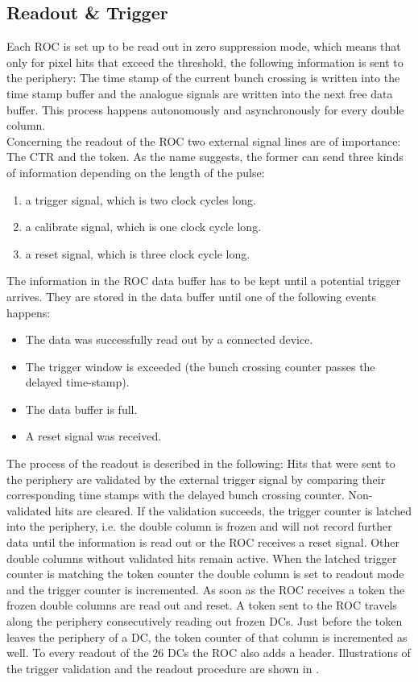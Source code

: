 \subsection{Readout \& Trigger}\label{sread}
Each \ac{ROC} is set up to be read out in zero suppression mode, which means that only for pixel hits that exceed the threshold, the following information is sent to the periphery: The time stamp of the current bunch crossing is written into the time stamp buffer and the analogue signals are written into the next free data buffer. This process happens autonomously and asynchronously for every double column.\\
Concerning the readout of the \ac{ROC} two external signal lines are of importance: The \ac{CTR} and the token. As the name suggests, the former can send three kinds of information depending on the length of the pulse:
\begin{enumerate}
	\item a trigger signal, which is two clock cycles long.
	\item a calibrate signal, which is one clock cycle long.
	\item a reset signal, which is three clock cycle long.
\end{enumerate}
The information in the \ac{ROC} data buffer has to be kept until a potential trigger arrives. They are stored in the data buffer until one of the following events happens: 
\begin{itemize}
	\item The data was successfully read out by a connected device.
	\item The trigger window is exceeded (the bunch crossing counter passes the delayed time-stamp).
	\item The data buffer is full.
	\item A reset signal was received.
\end{itemize}
The process of the readout is described in the following: Hits that were sent to the periphery are validated by the external trigger signal by comparing their corresponding time stamps with the delayed bunch crossing counter. Non-validated hits are cleared. If the validation succeeds, the trigger counter is latched into the periphery, i.e. the double column is frozen and will not record further data until the information is read out or the \ac{ROC} receives a reset signal. Other double columns without validated hits remain active. When the latched trigger counter is matching the token counter the double column is set to readout mode and the trigger counter is incremented. As soon as the \ac{ROC} receives a token the frozen double columns are read out and reset. A token sent to the \ac{ROC} travels along the periphery consecutively reading out frozen \ac{DC}s. Just before the token leaves the periphery of a \ac{DC}, the token counter of that column is incremented as well. To every readout of the $26$ \ac{DC}s the \ac{ROC} also adds a header. Illustrations of the trigger validation and the readout procedure are shown in .
